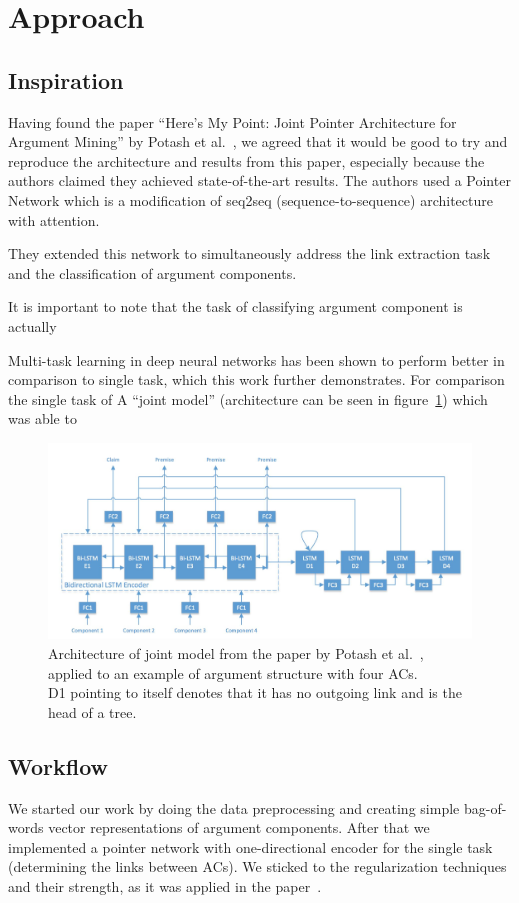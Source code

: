 \documentclass[onecolumn]{article}
\begin{document}
\section{Approach}
\subsection{Inspiration}
Having found the paper ``Here's My Point: Joint Pointer Architecture for Argument Mining'' by Potash et al.~\cite{potash2017here}, we agreed that it
would be good to try and reproduce the architecture and results from this paper, especially because the authors claimed they achieved
state-of-the-art results. The authors used a Pointer Network which is a modification of seq2seq (sequence-to-sequence) architecture with attention.

They extended this network to simultaneously address the link extraction task and the classification of argument components.

It is important to note that the task of classifying argument component is actually

Multi-task learning in deep neural networks has been shown to perform better in comparison to single task, which this work further demonstrates.
For comparison the single task of
A ``joint model'' (architecture can be seen in figure~\ref{fig:joint}) which was able to

\begin{figure}[h]
    \centering
    \includegraphics[width=0.8\linewidth]{fig/joint.png}
    \caption{Architecture of joint model from the paper by Potash et al.~\cite{potash2017here}, applied to an example of argument structure with four ACs.\\
             D1 pointing to itself denotes that it has no outgoing link and is the head of a tree.}\label{fig:joint}
\end{figure}

\subsection{Workflow}
We started our work by doing the data preprocessing and creating simple bag-of-words vector representations of argument components.
After that we implemented a pointer network with one-directional encoder for the single task (determining the links between ACs).
We sticked to the regularization techniques and their strength, as it was applied in the paper~\cite{potash2017here}.
\end{document}
